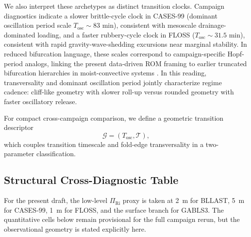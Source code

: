 \documentclass[12pt,a4paper]{article}
\begin{document}
We also interpret these archetypes as distinct transition clocks. Campaign diagnostics indicate a slower brittle-cycle clock in CASES-99 (dominant oscillation period scale $T_{\mathrm{osc}} \sim 83\text{~min}$), consistent with mesoscale drainage-dominated loading, and a faster rubbery-cycle clock in FLOSS ($T_{\mathrm{osc}} \sim 31.5\text{~min}$), consistent with rapid gravity-wave-shedding excursions near marginal stability. In reduced bifurcation language, these scales correspond to campaign-specific Hopf-period analogs, linking the present data-driven ROM framing to earlier truncated bifurcation hierarchies in moist-convective systems \citep{ShirerMoist1980}. In this reading, transversality and dominant oscillation period jointly characterize regime cadence: cliff-like geometry with slower roll-up versus rounded geometry with faster oscillatory release.

For compact cross-campaign comparison, we define a geometric transition descriptor
\begin{equation}
\mathcal{G} = (T_{\mathrm{osc}},\mathcal{T}),
\end{equation}
which couples transition timescale and fold-edge transversality in a two-parameter classification.

\subsection{Structural Cross-Diagnostic Table}

For the present draft, the low-level $\Pi_{\mathrm{Ri}}$ proxy is taken at 2~m for BLLAST, 5~m for CASES-99, 1~m for FLOSS, and the surface branch for GABLS3. The quantitative cells below remain provisional for the full campaign rerun, but the observational geometry is stated explicitly here.
\end{document}
